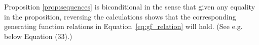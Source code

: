 \documentclass[11pt]{amsart}
\theoremstyle{definition}
\numberwithin{equation}{section}
\begin{document}
%
%
%

Proposition \ref{prop:sequences} is biconditional in the sense that given any equality in the proposition, reversing the calculations shows that the corresponding generating function relations in Equation~\eqref{eq:gf_relation}
will hold.  (See e.g.~\cite{AL15} below Equation (33).)
\end{document}
